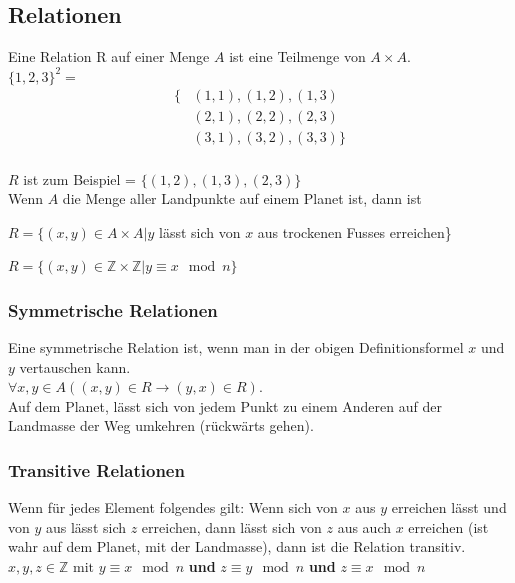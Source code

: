 \documentclass[12pt]{scrartcl}
\begin{document}
\subsection{Relationen}
Eine Relation R auf einer Menge $A$ ist eine Teilmenge von $A \times A$.\\

$\{1,2,3\}^2 = $
\begin{align*}
    \{ &(1,1), (1,2), (1,3) \\
       &(2,1), (2,2), (2,3) \\
       &(3,1), (3,2), (3,3)\} \\
\end{align*}

$R$ ist zum Beispiel = $\{(1,2), (1,3), (2,3)\}$\\

Wenn $A$ die Menge aller Landpunkte auf einem Planet ist, dann ist

$R = \{(x,y) \in A \times A | y$ lässt sich von $x$ aus trockenen Fusses erreichen\}

$R = \{(x,y) \in \mathbb{Z} \times \mathbb{Z}|y \equiv x \mod n\}$


\subsubsection{Symmetrische Relationen}
Eine symmetrische Relation ist, wenn man in der obigen Definitionsformel $x$ und $y$ vertauschen kann.\\

$\forall x,y \in A((x,y) \in R \longrightarrow (y,x) \in R)$.\\

Auf dem Planet, lässt sich von jedem Punkt zu einem Anderen auf der Landmasse der Weg umkehren (rückwärts gehen).

\newpage
\subsubsection{Transitive Relationen}
Wenn für jedes Element folgendes gilt: Wenn sich von $x$ aus $y$ erreichen lässt und von $y$ aus lässt sich $z$ erreichen, 
dann lässt sich von $z$ aus auch $x$ erreichen (ist wahr auf dem Planet, mit der Landmasse), dann ist die Relation transitiv.\\

$x,y,z \in \mathbb{Z} \text{ mit } y \equiv x \mod n$ \textbf{und} $z \equiv y \mod n$ \textbf{und} $z \equiv x \mod n$\\
\end{document}
